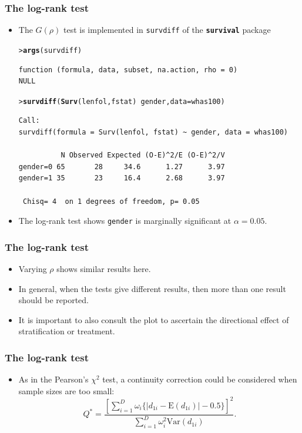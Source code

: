 \documentclass[10pt]{beamer}\usepackage[]{graphicx}\usepackage[]{color}
\makeatletter
\newcommand{\hlopt}[1]{\textcolor[rgb]{0,0,0}{#1}}%
\newcommand{\hlstd}[1]{\textcolor[rgb]{0.345,0.345,0.345}{#1}}%
\newcommand{\hlkwc}[1]{\textcolor[rgb]{0.333,0.667,0.333}{#1}}%
\newcommand{\hlkwd}[1]{\textcolor[rgb]{0.737,0.353,0.396}{\textbf{#1}}}%
\newenvironment{kframe}{%
 \def\at@end@of@kframe{}%
 \ifinner\ifhmode%
  \def\at@end@of@kframe{\end{minipage}}%
  \begin{minipage}{\columnwidth}%
 \fi\fi%
 \def\FrameCommand##1{\hskip\@totalleftmargin \hskip-\fboxsep
 \colorbox{shadecolor}{##1}\hskip-\fboxsep
     \hskip-\linewidth \hskip-\@totalleftmargin \hskip\columnwidth}%
 \MakeFramed {\advance\hsize-\width
   \@totalleftmargin\z@ \linewidth\hsize
   \@setminipage}}%
 {\par\unskip\endMakeFramed%
 \at@end@of@kframe}
\newenvironment{knitrout}{}{} %
\renewenvironment{knitrout}{\setlength{\topsep}{-.2mm}}{}
\newcommand{\pkg}[1]{{\textbf{\texttt{#1}}}}
\newcommand{\code}[1]{{\texttt{#1}}}
\newcommand{\Var}{\mathrm{Var}}
\newcommand{\E}{\mathrm{E}}
\makeatother
\begin{document}
\begin{frame}[fragile]
  \frametitle{The log-rank test}
  \begin{itemize}
  \item The $G(\rho)$ test is implemented in \code{survdiff} of the \pkg{survival} package
\begin{knitrout}\scriptsize
{}\color{fgcolor}\begin{kframe}
\begin{alltt}
\hlstd{> }\hlkwd{args}\hlstd{(survdiff)}
\end{alltt}
\begin{verbatim}
function (formula, data, subset, na.action, rho = 0) 
NULL
\end{verbatim}
\begin{alltt}
\hlstd{> }\hlkwd{survdiff}\hlstd{(}\hlkwd{Surv}\hlstd{(lenfol, fstat)} \hlopt{~} \hlstd{gender,} \hlkwc{data} \hlstd{= whas100)}
\end{alltt}
\begin{verbatim}
Call:
survdiff(formula = Surv(lenfol, fstat) ~ gender, data = whas100)

          N Observed Expected (O-E)^2/E (O-E)^2/V
gender=0 65       28     34.6      1.27      3.97
gender=1 35       23     16.4      2.68      3.97

 Chisq= 4  on 1 degrees of freedom, p= 0.05 
\end{verbatim}
\end{kframe}
\end{knitrout}
  \item The log-rank test shows \code{gender} is marginally significant at $\alpha = 0.05$.
  \end{itemize}
\end{frame}


\begin{frame}
  \frametitle{The log-rank test}
  \begin{itemize}
  \item Varying $\rho$ shows similar results here.
  \item In general, when the tests give different results, then more than one result should be reported.
  \item It is important to also consult the plot to ascertain the directional effect of stratification or treatment.
  \end{itemize}
\end{frame}


\begin{frame}
  \frametitle{The log-rank test}
  \begin{itemize}
  \item As in the Pearson's $\chi^2$ test, a continuity correction could be considered when sample sizes are too small: 
    \begin{equation*}
      Q^*= \frac{\left[\sum_{i = 1}^D\omega_i\{|d_{1i} - \E(d_{1i})| - 0.5\}\right]^2}{\sum_{i = 1}^D\omega_i^2\Var(d_{1i})}.
      \end{equation*}
  \end{itemize}
\end{frame}
\end{document}
